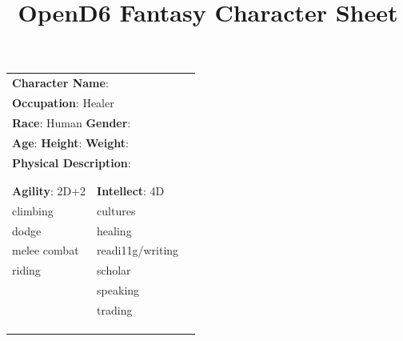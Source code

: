 \documentclass[10pt]{article}
\title{OpenD6 Fantasy Character Sheet}
\begin{document}
\pagestyle{fancy}
\fancyhf{}
\fancyfoot[R]{\thepage}
\renewcommand{\headrulewidth}{0pt}


\cleardoublepage
\begin{table}
\begin{tabular}{m{156pt} m{156pt} m{156pt}}
    \multicolumn{2}{l}{\textbf{Character Name}:  \hrulefill} \\
    \multicolumn{2}{l}{\textbf{Occupation}: Healer \hrulefill} \\
    \multicolumn{2}{l}{\textbf{Race}: Human \hrulefill \hspace{1em} \textbf{Gender}:  \hrulefill} \\
    \multicolumn{2}{l}{\textbf{Age}:  \hrulefill \hspace{1em} \textbf{Height}:  \hrulefill \hspace{1em}  \textbf{Weight}:  \hrulefill } \\
    \multicolumn{2}{l}{\textbf{Physical Description}:  \hrulefill } \\
    \multicolumn{2}{l}{ \hrulefill } \\
 & & \\
\textbf{Agility}: 2D+2 \hrulefill      & \textbf{Intellect}: 4D \hrulefill  &                             \\

climbing             \hrulefill & cultures             \hrulefill & \\

dodge                \hrulefill & healing              \hrulefill & \\

melee combat         \hrulefill & readi11g/writing     \hrulefill & \\

riding               \hrulefill & scholar              \hrulefill & \\

 \hrulefill & speaking             \hrulefill & \\

 \hrulefill & trading              \hrulefill & \\

 \hrulefill &  \hrulefill & \\

 \hrulefill &  \hrulefill & \\

 \hrulefill &  \hrulefill & \\


\end{tabular}
\end{table}
\end{document}
